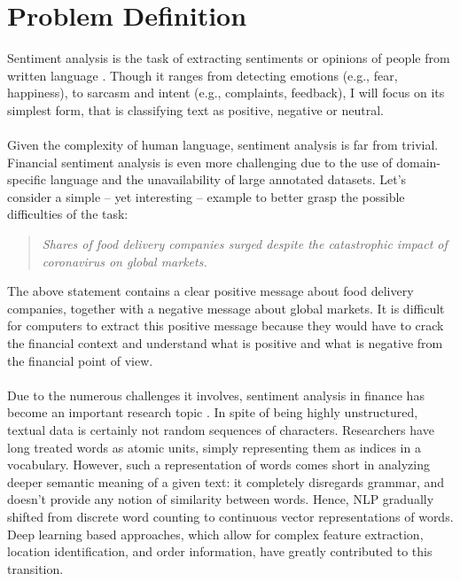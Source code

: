 \documentclass[final]{cvpr}
\begin{document}
\section{Problem Definition}

Sentiment analysis is the task of extracting sentiments or opinions of people from written language \cite{liu_2015}. Though it ranges from detecting emotions (e.g., fear, happiness), to sarcasm and intent (e.g., complaints, feedback), I will focus on its simplest form, that is classifying text as positive, negative or neutral.\\
\\
Given the complexity of human language, sentiment analysis is far from trivial. Financial sentiment analysis is even more challenging due to the use of domain-specific language and the unavailability of large annotated datasets. Let's consider a simple -- yet interesting -- example to better grasp the possible difficulties of the task:

\vspace{2mm}

\begin{quote}
	\centering
	\textit{Shares of food delivery companies surged despite the catastrophic impact of coronavirus on global markets.}
\end{quote}

\vspace{2mm}

\noindent 
The above statement contains a clear positive message about food delivery companies, together with a negative message about global markets. It is difficult for computers to extract this positive message because they would have to crack the financial context and understand what is positive and what is negative from the financial point of view.\\
\\
Due to the numerous challenges it involves, sentiment analysis in finance has become an important research topic \cite{financial_sentiment-1,financial_sentiment-2,financial_sentiment-3,financial_sentiment-4,financial_sentiment-5}. In spite of being highly unstructured, textual data is certainly not random sequences of characters. Researchers have long treated words as atomic units, simply representing them as indices in a vocabulary. However, such a representation of words comes short in analyzing deeper semantic meaning of a given text: it completely disregards grammar, and doesn't provide any notion of similarity between words. Hence, NLP gradually shifted from discrete word counting to continuous vector representations of words. Deep learning based approaches, which allow for complex feature extraction, location identification, and order information, have greatly contributed to this transition.
\end{document}
